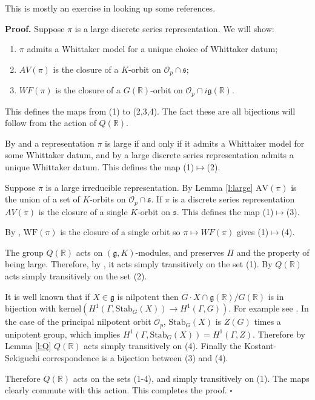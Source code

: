 \documentclass[10pt,leqno]{article}
\newcommand{\qed}{\hfill $\square$ \medskip}
\newenvironment{proof}[1][Proof]{\noindent\textbf{#1.} }{\qed}
\newcommand{\kernel}{\mathrm{kernel}}
\newcommand{\Stab}{\mathrm{Stab}}
\renewcommand{\O}{\mathcal O}
\newcommand{\R}{\mathbb R}
\newcommand{\g}{\mathfrak g}
\newcommand{\s}{\mathfrak s}
\newcommand{\AV}{\mathrm{AV}}
\newcommand{\WF}{\mathrm{WF}}
\newcommand{\Op}{\O_p}
\begin{document}
This is mostly an exercise in looking up some references.

\medskip

\begin{proof}
Suppose $\pi$ is a large discrete series representation.
We will show:
\begin{enumerate}
\item $\pi$ admits a Whittaker model for a unique choice of Whittaker datum;
\item $AV(\pi)$ is the closure of a $K$-orbit on $\Op\cap\s$;
\item $WF(\pi)$ is the closure of a $G(\R)$-orbit on $\Op\cap i\g(\R)$.
\end{enumerate}
This defines the maps from (1) to (2,3,4). The fact these are all bijections will follow from the action of $Q(\R)$.

By \cite{Vogan78} and \cite{kostant_whittaker}
a representation $\pi$ is large if and only if it admits a Whittaker model for some Whittaker datum,
and by \cite[Lemma 14.14]{abv} a  large discrete series representation admits a unique Whittaker datum.
This defines the map (1)$\mapsto$(2).

Suppose $\pi$ is a large irreducible representation.
By Lemma \ref{l:large} $\AV(\pi)$ is the union of a set of $K$-orbits on $\Op\cap\s$.
If $\pi$ is a discrete series representation $AV(\pi)$ is the closure of a single $K$-orbit on $\s$.
This defines the map (1)$\mapsto$(3).

By \cite{rossmann_limit_orbits}, $\WF(\pi)$ is the closure of a single orbit
so $\pi\mapsto WF(\pi)$ gives  (1)$\mapsto$(4).

The group $Q(\R)$ acts on  $(\g,K)$-modules, and preserves $\Pi$ and the property of being large.
Therefore, by \cite[(14.15)(d)]{abv}, it acts simply transitively on the set (1).
By \cite[(14.15)(c)]{abv} $Q(\R)$ acts simply transitively on the set (2).

It is well known that if $X\in\g$ is nilpotent then  $G\cdot X\cap \g(\R)/G(\R)$ is in bijection with
$\kernel(H^1(\Gamma,\Stab_G(X)) \rightarrow H^1(\Gamma,G))$. For example see \cite[Lemma 5.2]{galois}.
In the case of the principal nilpotent orbit $\Op$, $\Stab_G(X)$ is $Z(G)$ times a unipotent group,
which implies $H^1(\Gamma,\Stab_G(X))=H^1(\Gamma,Z)$. Therefore by Lemma \ref{l:Q} $Q(\R)$ acts simply transitively
on (4).
Finally the Kostant-Sekiguchi correspondence \cite{sekiguchi} is a bijection between (3) and (4).

Therefore $Q(\R)$ acts on the sets (1-4), and simply transitively on (1). The maps clearly commute with this action. This completes the proof.
\end{proof}
\end{document}
